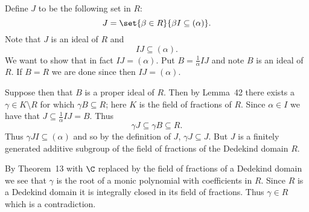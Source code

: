 Define $J$ to be the following set in $R$:
\[ J = \set{\beta\in R}{\beta I\subseteq(\alpha)} . \]
Note that $J$ is an ideal of $R$ and
\[ IJ \subseteq (\alpha) . \]
We want to show that in fact $IJ=(\alpha)$.  Put $B=\frac{1}{\alpha}IJ$ and note $B$ is an ideal of $R$.  If $B=R$ we are done since then $IJ=(\alpha)$.

Suppose then that $B$ is a proper ideal of $R$.  Then by Lemma~42 there exists a $\gamma\in K\setminus R$ for which $\gamma B\subseteq R$; here $K$ is the field of fractions of $R$.  Since $\alpha\in I$ we have that $J\subseteq\frac{1}{\alpha}IJ=B$.  Thus
\[ \gamma J \subseteq \gamma B \subseteq R . \]
Thus $\gamma JI\subseteq(\alpha)$ and so by the definition of $J$, $\gamma J\subseteq J$.  But $J$ is a finitely generated additive subgroup of the field of fractions of the Dedekind domain $R$.

By Theorem~13 with $\C$ replaced by the field of fractions of a Dedekind domain we see that $\gamma$ is the root of a monic polynomial with coefficients in $R$.  Since $R$ is a Dedekind domain it is integrally closed in its field of fractions.  Thus $\gamma\in R$ which is a contradiction.